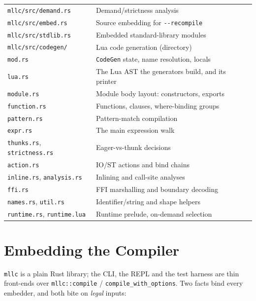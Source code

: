 \documentclass[11pt,a4paper]{article}
\begin{document}
\begin{tabular}{@{}ll@{}}
\texttt{mllc/src/demand.rs}       & Demand/strictness analysis \\
\texttt{mllc/src/embed.rs}        & Source embedding for \texttt{-{}-recompile} \\
\texttt{mllc/src/stdlib.rs}       & Embedded standard-library modules \\
\texttt{mllc/src/codegen/}        & Lua code generation (directory) \\
\quad \texttt{mod.rs}             & \texttt{CodeGen} state, name resolution, locals \\
\quad \texttt{lua.rs}             & The Lua AST the generators build, and its printer \\
\quad \texttt{module.rs}          & Module body layout: constructors, exports \\
\quad \texttt{function.rs}        & Functions, clauses, where-binding groups \\
\quad \texttt{pattern.rs}         & Pattern-match compilation \\
\quad \texttt{expr.rs}            & The main expression walk \\
\quad \texttt{thunks.rs}, \texttt{strictness.rs} & Eager-vs-thunk decisions \\
\quad \texttt{action.rs}          & IO/ST actions and bind chains \\
\quad \texttt{inline.rs}, \texttt{analysis.rs} & Inlining and call-site analyses \\
\quad \texttt{ffi.rs}             & FFI marshalling and boundary decoding \\
\quad \texttt{names.rs}, \texttt{util.rs} & Identifier/string and shape helpers \\
\quad \texttt{runtime.rs}, \texttt{runtime.lua} & Runtime prelude, on-demand selection \\
\bottomrule
\end{tabular}

\section{Embedding the Compiler}
\label{sec:embedding-compiler}

\texttt{mllc} is a plain Rust library; the CLI, the REPL and the test
harness are thin front-ends over \texttt{mllc::compile} /
\texttt{compile\_with\_options}.  Two facts bind every embedder, and
both bite on \emph{legal} inputs:
\end{document}
